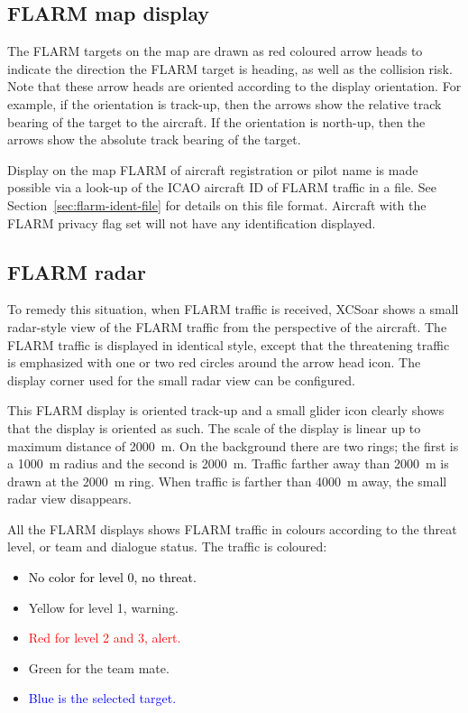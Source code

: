 \subsection*{FLARM map display}

The FLARM targets on the map are drawn as red coloured 
arrow heads to indicate the direction the FLARM target is
heading, as well as the collision risk.  Note that these
arrow heads are oriented according to the display orientation.  For example, if 
the orientation is track-up, then the arrows show the relative track bearing of
the target to the aircraft.  If the orientation is north-up, then the arrows show the
absolute track bearing of the target.

Display on the map FLARM of aircraft registration or pilot name is
made possible via a look-up of the ICAO aircraft ID of FLARM traffic
in a file.  See Section~\ref{sec:flarm-ident-file} for details on this
file format.  Aircraft with the FLARM privacy flag set will not have
any identification displayed.


\subsection*{FLARM radar}

To remedy this situation, when FLARM traffic is received, XCSoar shows a 
small radar-style view of the FLARM
traffic from the perspective of the aircraft.  The FLARM traffic is
displayed in identical style, except that the threatening traffic is emphasized 
with one or two red circles around the arrow head icon.  The display corner used 
for the small radar view can be configured.

This FLARM display is oriented track-up and a small glider icon
clearly shows that the display is oriented as such.  The scale of the
display is linear up to maximum distance of 2000~m.  On the
background there are two rings; the first is a 1000~m radius and the second
is 2000~m.  Traffic farther away than 2000~m is drawn at the 2000~m ring.
When traffic is farther than 4000~m away, the small radar view disappears.

All the FLARM displays shows FLARM traffic in colours according to
the threat level, or team and dialogue status.  The traffic is coloured:
\begin{itemize}
\item \textcolor{black} {No color for level 0, no threat.} 
\item \textcolor{warning} { Yellow for level 1, warning.}
\item \textcolor{red} {Red for level 2 and 3, alert.}
\item \textcolor{teammate} {Green for the team mate.}
\item \textcolor{blue} {Blue is the selected target.}
\end{itemize}


